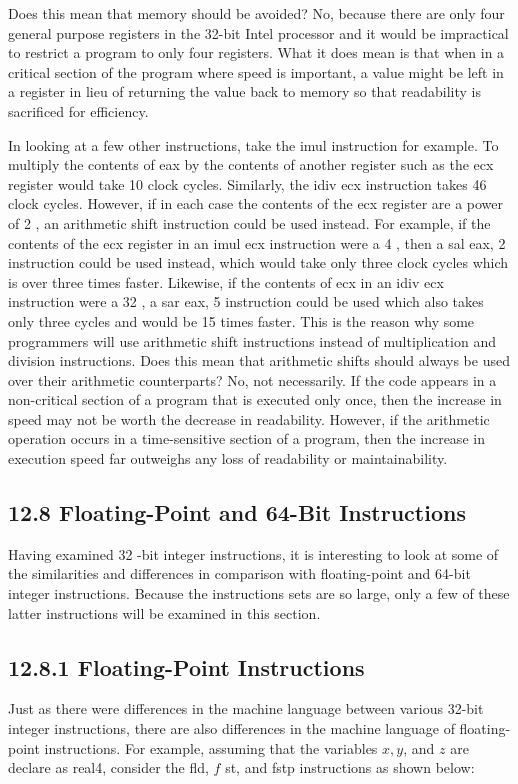 \documentclass[10pt]{book}
\begin{document}
Does this mean that memory should be avoided? No, because there are only four general purpose registers in the 32-bit Intel processor and it would be impractical to restrict a program to only four registers. What it does mean is that when in a critical section of the program where speed is important, a value might be left in a register in lieu of returning the value back to memory so that readability is sacrificed for efficiency.

In looking at a few other instructions, take the imul instruction for example. To multiply the contents of eax by the contents of another register such as the ecx register would take 10 clock cycles. Similarly, the idiv ecx instruction takes 46 clock cycles. However, if in each case the contents of the ecx register are a power of 2 , an arithmetic shift instruction could be used instead. For example, if the contents of the ecx register in an imul ecx instruction were a 4 , then a sal eax, 2 instruction could be used instead, which would take only three clock cycles which is over three times faster. Likewise, if the contents of ecx in an idiv ecx instruction were a 32 , a sar eax, 5 instruction could be used which also takes only three cycles and would be 15 times faster. This is the reason why some programmers will use arithmetic shift instructions instead of multiplication and division instructions. Does this mean that arithmetic shifts should always be used over their arithmetic counterparts? No, not necessarily. If the code appears in a non-critical section of a program that is executed only once, then the increase in speed may not be worth the decrease in readability. However, if the arithmetic operation occurs in a time-sensitive section of a program, then the increase in execution speed far outweighs any loss of readability or maintainability.

\subsection*{12.8 Floating-Point and 64-Bit Instructions}
Having examined 32 -bit integer instructions, it is interesting to look at some of the similarities and differences in comparison with floating-point and 64-bit integer instructions. Because the instructions sets are so large, only a few of these latter instructions will be examined in this section.

\subsection*{12.8.1 Floating-Point Instructions}
Just as there were differences in the machine language between various 32-bit integer instructions, there are also differences in the machine language of floating-point instructions. For example, assuming that the variables $x, y$, and $z$ are declare as real4, consider the fld, $f$ st, and fstp instructions as shown below:
\end{document}
